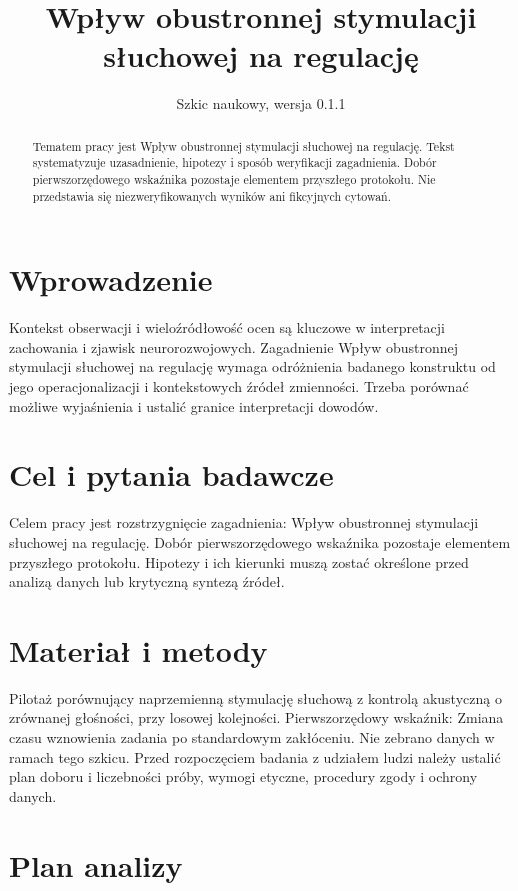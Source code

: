 \documentclass[11pt,a4paper]{article}
\title{Wpływ obustronnej stymulacji słuchowej na regulację}
\author{}
\date{Szkic naukowy, wersja 0.1.1}
\begin{document}
\maketitle

\begin{abstract}

Tematem pracy jest Wpływ obustronnej stymulacji słuchowej na regulację. Tekst systematyzuje uzasadnienie, hipotezy i sposób weryfikacji zagadnienia. Dobór pierwszorzędowego wskaźnika pozostaje elementem przyszłego protokołu. Nie przedstawia się niezweryfikowanych wyników ani fikcyjnych cytowań.

\end{abstract}

\section{Wprowadzenie}

Kontekst obserwacji i wieloźródłowość ocen są kluczowe w interpretacji zachowania i zjawisk neurorozwojowych. Zagadnienie Wpływ obustronnej stymulacji słuchowej na regulację wymaga odróżnienia badanego konstruktu od jego operacjonalizacji i kontekstowych źródeł zmienności. Trzeba porównać możliwe wyjaśnienia i ustalić granice interpretacji dowodów.

\section{Cel i pytania badawcze}

Celem pracy jest rozstrzygnięcie zagadnienia: Wpływ obustronnej stymulacji słuchowej na regulację. Dobór pierwszorzędowego wskaźnika pozostaje elementem przyszłego protokołu. Hipotezy i ich kierunki muszą zostać określone przed analizą danych lub krytyczną syntezą źródeł.

\section{Materiał i metody}

Pilotaż porównujący naprzemienną stymulację słuchową z kontrolą akustyczną o zrównanej głośności, przy losowej kolejności. Pierwszorzędowy wskaźnik: Zmiana czasu wznowienia zadania po standardowym zakłóceniu. Nie zebrano danych w ramach tego szkicu. Przed rozpoczęciem badania z udziałem ludzi należy ustalić plan doboru i liczebności próby, wymogi etyczne, procedury zgody i ochrony danych.

\section{Plan analizy}
\end{document}
